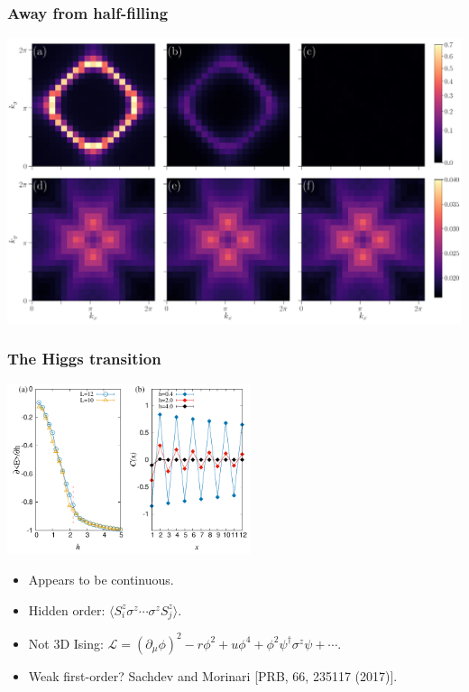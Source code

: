 \documentclass[xcolor=table, 10pt, aspectratio=43]{beamer}
\begin{document}
\begin{frame}
\frametitle{Away from half-filling}
\begin{center}
	\includegraphics[width=\textwidth]{figS1}
\end{center}
\end{frame}

\begin{frame}
\frametitle{The Higgs transition}
\begin{center}
	\includegraphics[height=5cm]{fig3}
\end{center}
\begin{itemize}
	\item Appears to be continuous.
	\item Hidden order: $\langle S_i^z\sigma^z\cdots\sigma^zS_j^z\rangle$.
	\item Not 3D Ising:
	$\mathcal L = (\partial_\mu\phi)^2-r\phi^2+u\phi^4+\phi^2\psi^\dagger\sigma^z\psi+\cdots$.
	\item Weak first-order? Sachdev and Morinari [PRB, 66, 235117 (2017)].
\end{itemize}
\end{frame}
\end{document}
